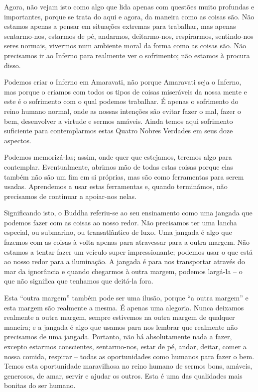 Agora, não vejam isto como algo que lida apenas com questões muito profundas e
importantes, porque se trata do aqui e agora, da maneira como as coisas são. Não
estamos apenas a pensar em situações extremas para trabalhar, mas apenas
sentarmo-nos, estarmos de pé, andarmos, deitarmo-nos, respirarmos, sentindo-nos
seres normais, vivermos num ambiente moral da forma como as coisas são. Não
precisamos ir ao Inferno para realmente ver o sofrimento; não estamos à procura
disso.

Podemos criar o Inferno em Amaravati, não porque Amaravati seja o Inferno, mas
porque o criamos com todos os tipos de coisas miseráveis da nossa mente e este é
o sofrimento com o qual podemos trabalhar. É apenas o sofrimento do reino humano
normal, onde as nossas intenções são evitar fazer o mal, fazer o bem,
desenvolver a virtude e sermos amáveis. Ainda temos aqui sofrimento suficiente
para contemplarmos estas Quatro Nobres Verdades em seus doze aspectos.

Podemos memorizá-las; assim, onde quer que estejamos, teremos algo para
contemplar. Eventualmente, abrimos mão de todas estas coisas porque elas também
não são um fim em si próprias, mas são como ferramentas para serem usadas.
Aprendemos a usar estas ferramentas e, quando terminámos, não precisamos de
continuar a apoiar-nos nelas.

Significando isto, o Buddha referiu-se ao seu ensinamento como uma jangada que
podemos fazer com as coisas ao nosso redor. Não precisamos ter uma lancha
especial, ou submarino, ou transatlântico de luxo. Uma jangada é algo que
fazemos com as coisas à volta apenas para atravessar para a outra margem. Não
estamos a tentar fazer um veículo super impressionante; podemos usar o que está
ao nosso redor para a iluminação. A jangada é para nos transportar através do
mar da ignorância e quando chegarmos à outra margem, podemos largá-la -- o que
não significa que tenhamos que deitá-la fora.

Esta ``outra margem'' também pode ser uma ilusão, porque ``a outra margem'' e
esta margem são realmente a mesma. É apenas uma alegoria. Nunca deixamos
realmente a outra margem, sempre estivemos na outra margem de qualquer maneira;
e a jangada é algo que usamos para nos lembrar que realmente não precisamos de
uma jangada. Portanto, não há absolutamente nada a fazer, excepto estarmos
conscientes, sentarmo-nos, estar de pé, andar, deitar, comer a nossa comida,
respirar -- todas as oportunidades como humanos para fazer o bem. Temos esta
oportunidade maravilhosa no reino humano de sermos bons, amáveis, generosos, de
amar, servir e ajudar os outros. Esta é uma das qualidades mais bonitas do ser
humano.

